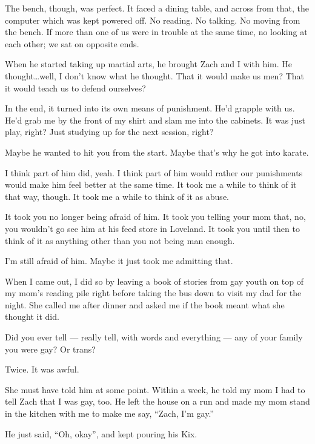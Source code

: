 The bench, though, was perfect. It faced a dining table, and across from that, the computer which was kept powered off. No reading. No talking. No moving from the bench. If more than one of us were in trouble at the same time, no looking at each other; we sat on opposite ends.

When he started taking up martial arts, he brought Zach and I with him. He thought\ldots{}well, I don't know what he thought. That it would make us men? That it would teach us to defend ourselves?

In the end, it turned into its own means of punishment. He'd grapple with us. He'd grab me by the front of my shirt and slam me into the cabinets. It was just play, right? Just studying up for the next session, right?

\begin{ally}
Maybe he wanted to hit you from the start. Maybe that's why he got into karate.
\end{ally}
I think part of him did, yeah. I think part of him would rather our punishments would make him feel better at the same time. It took me a while to think of it that way, though. It took me a while to think of it as abuse.

\begin{ally}
It took you no longer being afraid of him. It took you telling your mom that, no, you wouldn't go see him at his feed store in Loveland. It took you until then to think of it as anything other than you not being man enough.
\end{ally}
I'm still afraid of him. Maybe it just took me admitting that.
\newpage

\noindent When I came out, I did so by leaving a book of stories from gay youth on top of my mom's reading pile right before taking the bus down to visit my dad for the night. She called me after dinner and asked me if the book meant what she thought it did.

\begin{ally}
Did you ever tell --- really tell, with words and everything --- any of your family you were gay? Or trans?
\end{ally}
Twice. It was awful.

She must have told him at some point. Within a week, he told my mom I had to tell Zach that I was gay, too. He left the house on a run and made my mom stand in the kitchen with me to make me say, ``Zach, I'm gay.''

He just said, ``Oh, okay'', and kept pouring his Kix.

